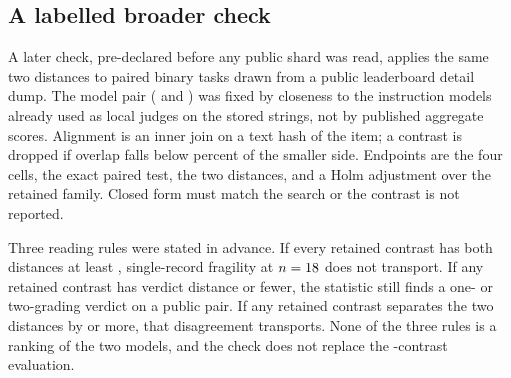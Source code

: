 \subsection{A labelled broader check}

A later check, pre-declared before any public shard was read, applies the
same two distances to \SecondEvalN{} paired binary tasks drawn from a
public leaderboard detail dump. The model pair
(\SecondEvalArmA{} and \SecondEvalArmB{}) was fixed by closeness to the
instruction models already used as local judges on the stored strings,
not by published aggregate scores. Alignment is an inner join on a
text hash of the item; a contrast is dropped if overlap falls below
\SecondEvalOverlapMin{} percent of the smaller side. Endpoints are the four cells, the
exact paired test, the two distances, and a Holm adjustment over the
retained family. Closed form must match the search or the contrast is
not reported.

Three reading rules were stated in advance. If every retained contrast
has both distances at least \SecondEvalFragileMax{}, single-record
fragility at $n=18{}$ does not transport. If any retained
contrast has verdict distance \FragileMax{} or fewer, the statistic
still finds a one- or two-grading verdict on a public pair. If any
retained contrast separates the two distances by \DecoupledGap{} or
more, that disagreement transports. None of the three rules is a
ranking of the two models, and the check does not replace the
\Contrasts{}-contrast evaluation.
